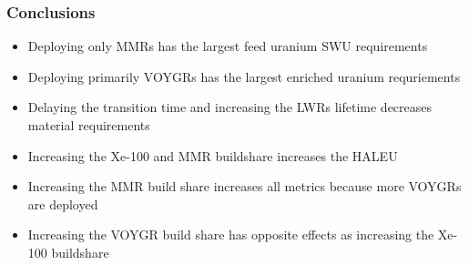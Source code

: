 \begin{frame}
      \frametitle{Conclusions}
      \begin{itemize}
        \item Deploying only \glspl{MMR} has the largest feed uranium 
              \gls{SWU} requirements
        \item Deploying primarily VOYGRs has the largest enriched uranium 
              requriements
        \item Delaying the transition time and increasing the \glspl{LWR}
              lifetime decreases material requirements
        \item Increasing the Xe-100 and \gls{MMR} buildshare increases the 
              \gls{HALEU} 
        \item Increasing the \gls{MMR} build share increases all metrics
              because more VOYGRs are deployed
        \item Increasing the VOYGR build share has opposite 
              effects as increasing the Xe-100 buildshare
      \end{itemize}
\end{frame}